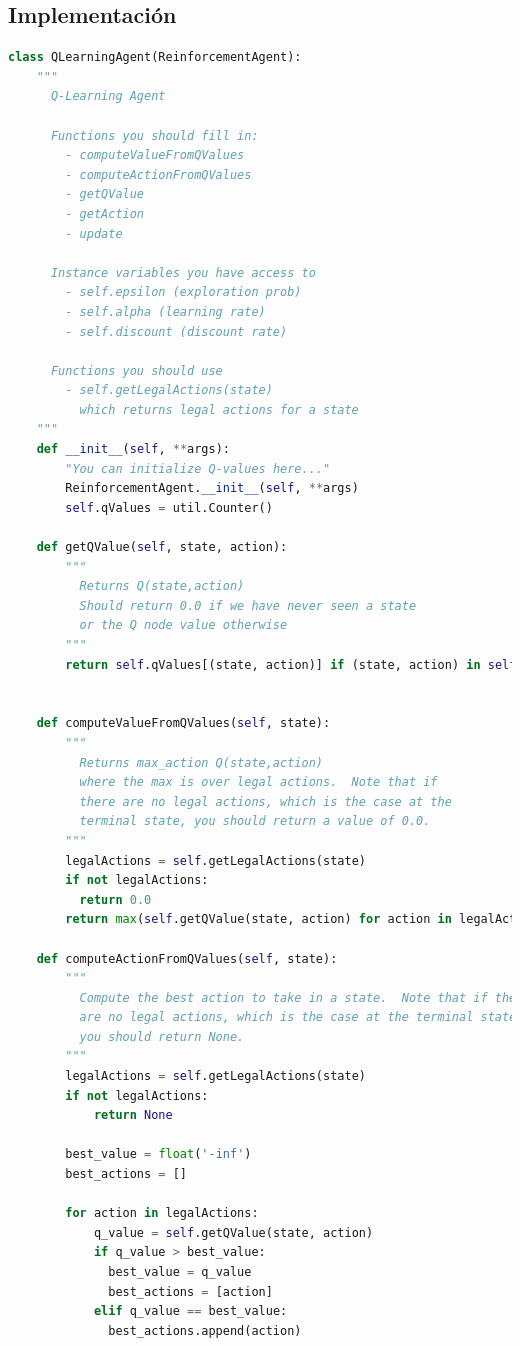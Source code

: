\documentclass{report}
\begin{document}
      \subsection*{Implementación}
\begin{lstlisting}[language=Python, caption=Q-Learning]
class QLearningAgent(ReinforcementAgent):
    """
      Q-Learning Agent

      Functions you should fill in:
        - computeValueFromQValues
        - computeActionFromQValues
        - getQValue
        - getAction
        - update

      Instance variables you have access to
        - self.epsilon (exploration prob)
        - self.alpha (learning rate)
        - self.discount (discount rate)

      Functions you should use
        - self.getLegalActions(state)
          which returns legal actions for a state
    """
    def __init__(self, **args):
        "You can initialize Q-values here..."
        ReinforcementAgent.__init__(self, **args)
        self.qValues = util.Counter()

    def getQValue(self, state, action):
        """
          Returns Q(state,action)
          Should return 0.0 if we have never seen a state
          or the Q node value otherwise
        """
        return self.qValues[(state, action)] if (state, action) in self.qValues else 0.0


    def computeValueFromQValues(self, state):
        """
          Returns max_action Q(state,action)
          where the max is over legal actions.  Note that if
          there are no legal actions, which is the case at the
          terminal state, you should return a value of 0.0.
        """
        legalActions = self.getLegalActions(state)
        if not legalActions:
          return 0.0
        return max(self.getQValue(state, action) for action in legalActions)
        
    def computeActionFromQValues(self, state):
        """
          Compute the best action to take in a state.  Note that if there
          are no legal actions, which is the case at the terminal state,
          you should return None.
        """
        legalActions = self.getLegalActions(state)
        if not legalActions:
            return None

        best_value = float('-inf')
        best_actions = []
        
        for action in legalActions:
            q_value = self.getQValue(state, action)
            if q_value > best_value:
              best_value = q_value
              best_actions = [action]
            elif q_value == best_value:
              best_actions.append(action)
        

\end{lstlisting}
\end{document}
